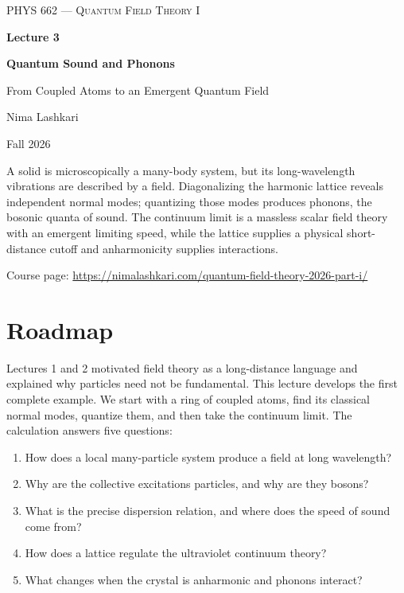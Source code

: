 \documentclass[11pt]{article}
\begin{document}

\begin{titlepage}
\centering
\vspace*{1.2in}
{\scshape\Large PHYS 662 --- Quantum Field Theory I\par}
\vspace{0.35in}
{\Huge\bfseries\color{qftblue} Lecture 3\par}
\vspace{0.15in}
{\LARGE\bfseries Quantum Sound and Phonons\par}
\vspace{0.12in}
{\Large\color{qftgreen} From Coupled Atoms to an Emergent Quantum Field\par}
\vspace{0.6in}
{\large Nima Lashkari\par}
{\large Fall 2026\par}
\vfill
\begin{minipage}{0.86\textwidth}
\small
A solid is microscopically a many-body system, but its long-wavelength
vibrations are described by a field.  Diagonalizing the harmonic lattice
reveals independent normal modes; quantizing those modes produces phonons,
the bosonic quanta of sound.  The continuum limit is a massless scalar field
theory with an emergent limiting speed, while the lattice supplies a physical
short-distance cutoff and anharmonicity supplies interactions.

\medskip
Course page: \url{https://nimalashkari.com/quantum-field-theory-2026-part-i/}
\end{minipage}
\vspace{0.5in}
\end{titlepage}

\tableofcontents
\newpage
{}

\section*{Roadmap}

Lectures 1 and 2 motivated field theory as a long-distance language and
explained why particles need not be fundamental.  This lecture develops the
first complete example.  We start with a ring of coupled atoms, find its
classical normal modes, quantize them, and then take the continuum limit.
The calculation answers five questions:
\begin{enumerate}
  \item How does a local many-particle system produce a field at long
  wavelength?
  \item Why are the collective excitations particles, and why are they
  bosons?
  \item What is the precise dispersion relation, and where does the speed of
  sound come from?
  \item How does a lattice regulate the ultraviolet continuum theory?
  \item What changes when the crystal is anharmonic and phonons interact?
\end{enumerate}
\end{document}
